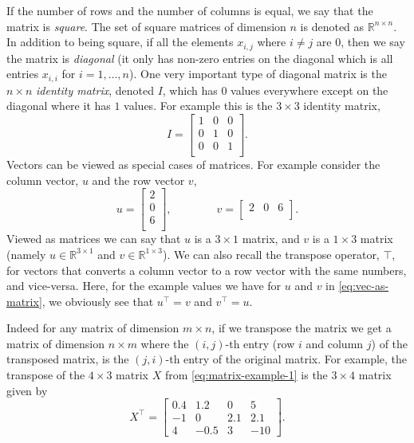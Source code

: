 If the number of rows and the number of columns is equal, we say that the matrix is {\em square}. The set of square matrices of dimension $n$ is denoted as ${\mathbb R}^{n \times n}$. In addition to being square, if all the elements $x_{i,j}$ where $i \neq j$ are $0$, then we say the matrix is {\em diagonal} (it only has non-zero entries on the diagonal which is all entries $x_{i,i}$ for $i=1,\ldots,n$). One very important type of diagonal matrix is the $n \times n$ {\em identity matrix}, denoted $I$, which has $0$ values everywhere except on the diagonal where it has $1$ values. For example this is the $3 \times 3$ identity matrix,
%
\begin{equation}
\label{eq:identity}
I
=
\begin{bmatrix}
    1 & 0 & 0\\
    0 & 1 & 0 \\
    0 & 0 & 1 \\
 \end{bmatrix}.
\end{equation}
%
Vectors can be viewed as special cases of matrices. For example consider the column vector, $u$ and the row vector $v$,
\begin{equation}
\label{eq:vec-as-matrix}
u = 
\begin{bmatrix}
2 \\
0 \\
6 \\
\end{bmatrix},
\qquad \qquad
v = 
\begin{bmatrix}
2 & 0 & 6\\
\end{bmatrix}.
\end{equation}
%
Viewed as matrices we can say that $u$ is a $3 \times 1$ matrix, and $v$ is a $1 \times 3$ matrix (namely $u \in {\mathbb R}^{3 \times 1}$ and $v \in {\mathbb R}^{1 \times 3}$). We can also recall the transpose operator, $\top$, for vectors that converts a column vector to a row vector with the same numbers, and vice-versa. Here, for the example values we have for $u$ and $v$ in \eqref{eq:vec-as-matrix}, we obviously see that $u^\top = v$ and $v^\top = u$.

Indeed for any matrix of dimension $m \times n$, if we transpose the matrix we get a matrix of dimension $n \times m$ where the $(i,j)$-th entry (row $i$ and column $j$) of the transposed matrix, is the $(j,i)$-th entry of the original matrix. For example, the transpose of the $4 \times 3$ matrix $X$ from \eqref{eq:matrix-example-1} is the $3 \times 4$ matrix given by
%
\begin{equation}
\label{eq:matrix-example-1-t}
X^\top =
\begin{bmatrix}
    0.4 & 1.2 & 0 & 5 \\
    -1 & 0 & 2.1 & 2.1 \\
    4 & -0.5 & 3 & -10
\end{bmatrix}.
\end{equation}
%

